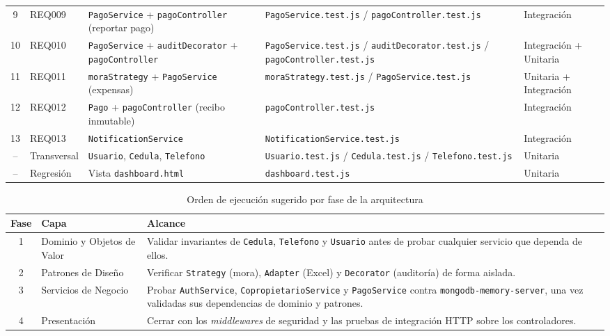\documentclass[12pt,a4paper]{article}
\begin{document}
\begin{table}[H]
\begin{tabular}{clp{3.7cm}p{3.6cm}l}
9  & REQ009 & \texttt{PagoService} + \texttt{pagoController} (reportar pago) & \texttt{PagoService.test.js} / \texttt{pagoController.test.js} & Integración \\
10 & REQ010 & \texttt{PagoService} + \texttt{auditDecorator} + \texttt{pagoController} & \texttt{PagoService.test.js} / \texttt{auditDecorator.test.js} / \texttt{pagoController.test.js} & Integración + Unitaria \\
11 & REQ011 & \texttt{moraStrategy} + \texttt{PagoService} (expensas) & \texttt{moraStrategy.test.js} / \texttt{PagoService.test.js} & Unitaria + Integración \\
12 & REQ012 & \texttt{Pago} + \texttt{pagoController} (recibo inmutable) & \texttt{pagoController.test.js} & Integración \\
13 & REQ013 & \texttt{NotificationService} & \texttt{NotificationService.test.js} & Integración \\
-- & Transversal & \texttt{Usuario}, \texttt{Cedula}, \texttt{Telefono} & \texttt{Usuario.test.js} / \texttt{Cedula.test.js} / \texttt{Telefono.test.js} & Unitaria \\
-- & Regresión & Vista \texttt{dashboard.html} & \texttt{dashboard.test.js} & Unitaria \\
\bottomrule
\end{tabular}
\end{table}

\begin{table}[H]
\centering
\caption{Orden de ejecución sugerido por fase de la arquitectura}
\label{tab:fases-plan}
\begin{tabular}{clp{8.5cm}}
\toprule
\textbf{Fase} & \textbf{Capa} & \textbf{Alcance} \\
\midrule
1 & Dominio y Objetos de Valor & Validar invariantes de \texttt{Cedula}, \texttt{Telefono} y \texttt{Usuario} antes de probar cualquier servicio que dependa de ellos. \\
2 & Patrones de Diseño & Verificar \texttt{Strategy} (mora), \texttt{Adapter} (Excel) y \texttt{Decorator} (auditoría) de forma aislada. \\
3 & Servicios de Negocio & Probar \texttt{AuthService}, \texttt{CopropietarioService} y \texttt{PagoService} contra \texttt{mongodb-memory-server}, una vez validadas sus dependencias de dominio y patrones. \\
4 & Presentación & Cerrar con los \emph{middlewares} de seguridad y las pruebas de integración HTTP sobre los controladores. \\
\bottomrule
\end{tabular}
\end{table}
\end{document}
